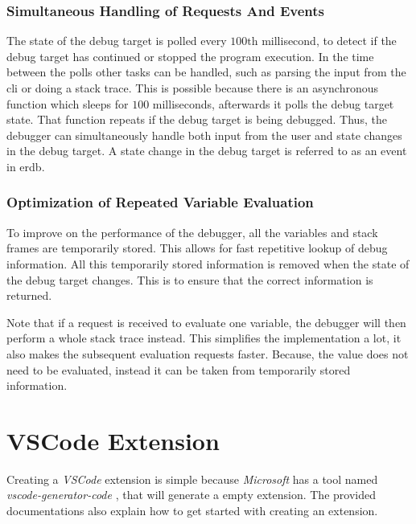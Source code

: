 \subsubsection{Simultaneous Handling of Requests And Events}
The state of the debug target is polled every $100\text{th}$ millisecond, to detect if the debug target has continued or stopped the program execution.
In the time between the polls other tasks can be handled, such as parsing the input from the \acrshort{cli} or doing a stack trace.
This is possible because there is an asynchronous function which sleeps for $100$ milliseconds, afterwards it polls the debug target state.
That function repeats if the debug target is being debugged.
Thus, the debugger can simultaneously handle both input from the user and state changes in the debug target.
A state change in the debug target is referred to as an event in \gls{erdb}.



\subsubsection{Optimization of Repeated Variable Evaluation}
To improve on the performance of the debugger, all the variables and stack frames are temporarily stored.
This allows for fast repetitive lookup of debug information.
All this temporarily stored information is removed when the state of the debug target changes.
This is to ensure that the correct information is returned.


Note that if a request is received to evaluate one variable, the debugger will then perform a whole stack trace instead.
This simplifies the implementation a lot, it also makes the subsequent evaluation requests faster.
Because, the value does not need to be evaluated, instead it can be taken from temporarily stored information.



\section{VSCode Extension}
Creating a \emph{VSCode} extension is simple because \emph{Microsoft} has a tool named \emph{vscode-generator-code} \cite{vscode-generator-code}, that will generate a empty extension.
The provided documentations also explain how to get started with creating an extension.


